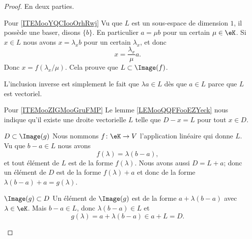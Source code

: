 \begin{proof}
    En deux parties.
    \begin{subproof}
        \item[Pour \ref{ITEMooYQCIooOrhRwj}]
            Vu que \( L\) est un sous-espace de dimension \( 1\), il possède une baser, disons \( \{ b \}\). En particulier \( a=\mu b\) pour un certain \( \mu\in \eK\). Si \( x\in L\) nous avons \( x=\lambda_x b\) pour un certain \( \lambda_x\), et donc
            \begin{equation}
                x=\frac{ \lambda_x }{ \mu }a.
            \end{equation}
            Donc \( x=f(\lambda_x/\mu)\). Cela prouve que \( L\subset\Image(f)\).

            L'inclusion inverse est simplement le fait que \( \lambda a\in L\) dès que \( a\in L\) parce que \( L\) est vectoriel.
        \item[Pour \ref{ITEMooZIGMooGruFMP}]
            Le lemme \ref{LEMooQQFFooEZYeck} nous indique qu'il existe une droite vectorielle \( L\) telle que \( D-x=L\) pour tout \( x\in D\).
            \begin{subproof}
                \item[\( D\subset\Image(g)\)]
                    Nous nommons \( f\colon \eK\to V\) l'application linéaire qui donne \( L\). Vu que \( b-a\in L\) nous avons
                    \begin{equation}
                        f(\lambda)=\lambda(b-a),
                    \end{equation}
                    et tout élément de \( L\) est de la forme \( f(\lambda)\). Nous avons aussi \( D=L+a\); donc un élément de \( D\) est de la forme \( f(\lambda)+a\) et donc de la forme \( \lambda(b-a)+a=g(\lambda)\).
                \item[\( \Image(g)\subset D\)]
                    Un élément de \( \Image(g)\) est de la forme \( a+\lambda(b-a)\) avec \( \lambda\in \eK\). Mais \( b-a\in L\), donc \( \lambda(b-a)\in L\) et 
                    \begin{equation}
                        g(\lambda)=a+\lambda(b-a)\in a+L=D.
                    \end{equation}
            \end{subproof}
    \end{subproof}
\end{proof}

